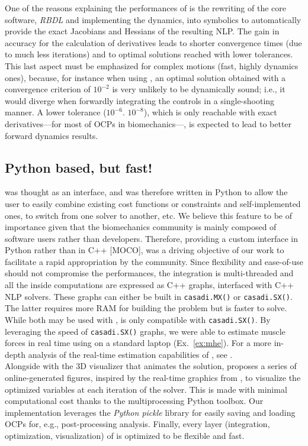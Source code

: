 One of the reasons explaining the performances of \bioptim is the rewriting of the core software, \textit{RBDL} and \biorbd implementing the dynamics, into \casadi symbolics to automatically provide the exact Jacobians and Hessians of the resulting NLP.  
The gain in accuracy for the calculation of derivatives leads to shorter convergence times (due to much less iterations) and to optimal solutions reached with lower tolerances.
This last aspect must be emphasized for complex motions (fast, highly dynamics ones), because, for instance when using \ipopt, an optimal solution obtained with a convergence criterion of $10^{-2}$ is very unlikely to be dynamically sound; 
i.e., it would diverge when forwardly integrating the controls in a single-shooting manner. 
A lower tolerance ($10^{-6}$. $10^{-8}$), which is only reachable with exact derivatives---for most of OCPs in biomechanics---, is expected to lead to better forward dynamics results.

\subsection{Python based, but fast!}

\bioptim was thought as an interface, and was therefore written in Python to allow the user to easily combine existing cost functions or constraints and self-implemented ones, to switch from one solver to another, etc. 
We believe this feature to be of importance given that the biomechanics community is mainly composed of software users rather than developers.
Therefore, providing a custom interface in Python rather than in C++ [MOCO], was a driving objective of our work to facilitate a rapid appropriation by the community.
Since flexibility and ease-of-use should not compromise the performances, the integration is multi-threaded and all the inside computations are expressed as C++ \casadi graphs, interfaced with C++ NLP solvers.
These graphs can either be built in \texttt{casadi.MX()} or \texttt{casadi.SX()}.
The latter requires more RAM for building the problem but is faster to solve.
While both may be used with \ipopt, \acados is only compatible with \texttt{casadi.SX()}.
By leveraging the speed of \texttt{casadi.SX()} graphs, we were able to estimate muscle forces in real time using \acados on a standard laptop (Ex.~\ref{ex:mhe}).
For a more in-depth analysis of the real-time estimation capabilities of \bioptim, see \cite{bailly2020real}.\\
Alongside with the 3D visualizer \bioviz that animates the solution, \bioptim proposes a series of online-generated figures, inspired by the  real-time graphics from \muscodii \addref, to visualize the optimized variables at each iteration of the solver.
This is made with minimal computational cost thanks to the multiprocessing Python toolbox. 
Our implementation leverages the \textit{Python pickle} library for easily saving and loading OCPs for, e.g., post-processing analysis.
Finally, every layer (integration, optimization, visualization) of \bioptim is optimized to be flexible and fast.

